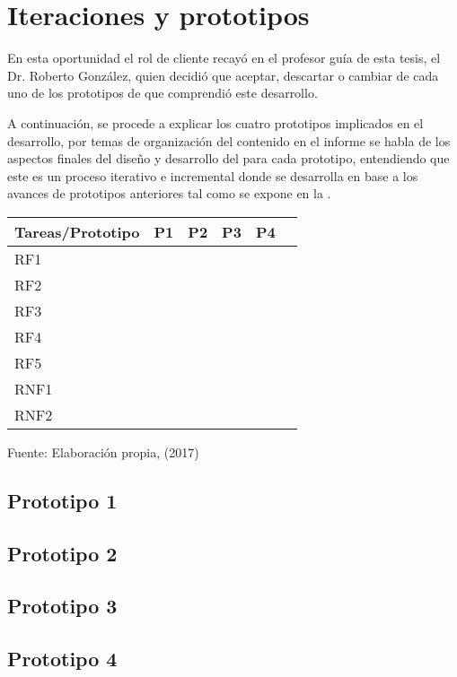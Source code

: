 \section{Iteraciones y prototipos}

En esta oportunidad el rol de cliente recayó en el profesor guía de esta tesis, el Dr. Roberto González, quien decidió que aceptar, descartar o cambiar de cada uno de los prototipos de  que comprendió este desarrollo. 

A continuación, se procede a explicar los cuatro prototipos implicados en el desarrollo, por temas de organización del contenido en el informe se habla de los aspectos finales del diseño y desarrollo del  para cada prototipo, entendiendo que este es un proceso iterativo e incremental donde se desarrolla en base a los avances de prototipos anteriores tal como se expone en la .

\begin{table}[H]
\centering
{}
\begin{tabular}{lccccc}\toprule
Tareas/Prototipo&P1&P2&P3&P4\\
\midrule
\rowcolor[gray]{0.9}
RF1										& \y & \y & \y & \y \\
RF2 						&    & \y & \y & \y \\
\rowcolor[gray]{0.9}
RF3 	&    & \y &    &    \\
RF4 							&    &    & \y &    \\
\rowcolor[gray]{0.9}
RF5 					&    &    &    & \y \\
RNF1 					&    &    &    & \y \\
\rowcolor[gray]{0.9}
RNF2  											& \y & \y & \y & \y \\
\bottomrule
\end{tabular}
\medskip
\par\centering Fuente: Elaboración propia, (2017)
\label{table:prototipos}
\end{table}


\subsection{Prototipo 1}

\subsection{Prototipo 2}

\subsection{Prototipo 3}

\subsection{Prototipo 4}